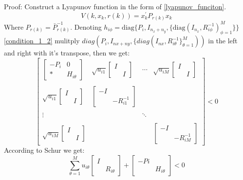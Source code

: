 \documentclass[conference]{IEEEtran}
\begin{document}
Proof: Construct a Lyapunov function in the form of \eqref{lyapunov_funciton}.
\begin{equation}\label{lyapunov_funciton} 
	V(k,x_k,r(k))=x^{'}_{k}P_{r(k)}x_{k}
\end{equation}
Where $P_{r(k)}=\bar{P}^{-1}_{r(k)}$. Denoting $h_{i\phi} = \mathrm{diag}\{P_{i}, I_{n_x+n_y},\{\mathrm{diag}(I_{n_x},R^{-1}_{i\phi})^{M}_{\phi=1} \} \}$
\\  \eqref{condition_1_2} mulitply $ diag(P_i,I_{nx+ny},\{diag(I_{nx},R_{i\theta}^{-1}\}_{\theta=1}^{M})) $ in the left and right with it's transpose, then we get:
\begin{equation}\nonumber
\begin{bmatrix} 
\begin{bmatrix}
-P_{i}&0\\
*&H_{i\theta}
\end{bmatrix}&
\sqrt{u_{i1}}\begin{bmatrix}
I&\\
&I
\end{bmatrix}&
\cdots&
\sqrt{u_{iM}}\begin{bmatrix}
I&\\
&I
\end{bmatrix}\\ \\
\sqrt{u_{i1}}\begin{bmatrix}
I&\\
&I
\end{bmatrix}&
\begin{bmatrix}
-I&\\
&-R^{-1}_{i1}
\end{bmatrix}&\\ \\ \vdots&&\ddots\\ \\
\sqrt{u_{iM}}\begin{bmatrix}
I&\\
&I
\end{bmatrix}&&&
\begin{bmatrix}
-I&\\
&-R^{-1}_{iM}
\end{bmatrix}

\end{bmatrix} <0
\end{equation}
According to Schur we get:
\begin{equation} \label{cons}
\sum_{\theta=1}^{M}u_{i\theta} \begin{bmatrix}
I&\\
&R_{i\theta}
\end{bmatrix} + \begin{bmatrix}
-Pi&\\
&H_{i\theta}
\end{bmatrix} <0
\end{equation}
\end{document}
